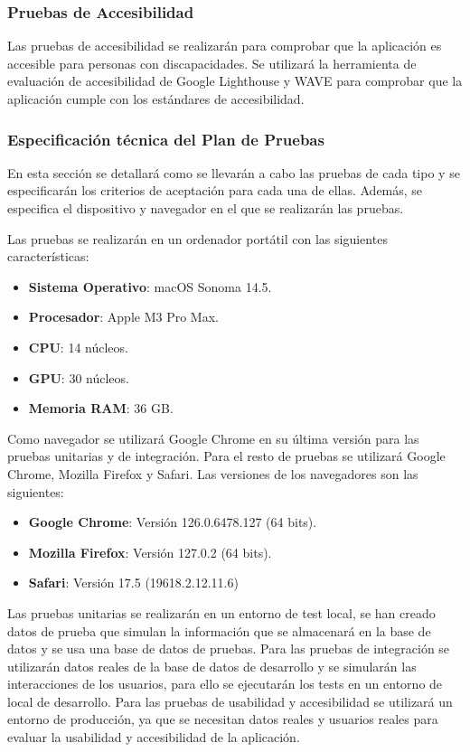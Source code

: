\subsubsection{Pruebas de Accesibilidad}
Las pruebas de accesibilidad se realizarán para comprobar que la aplicación es accesible para personas con discapacidades.
Se utilizará la herramienta de evaluación de accesibilidad de Google Lighthouse y WAVE para comprobar que la aplicación cumple con los estándares de accesibilidad.


\subsubsection{Especificación técnica del Plan de Pruebas}
En esta sección se detallará como se llevarán a cabo las pruebas de cada tipo y se especificarán los criterios de aceptación para cada una de ellas.
Además, se especifica el dispositivo y navegador en el que se realizarán las pruebas.

Las pruebas se realizarán en un ordenador portátil con las siguientes características:
\begin{itemize}
    \item \textbf{Sistema Operativo}: macOS Sonoma 14.5.
    \item \textbf{Procesador}: Apple M3 Pro Max.
    \item \textbf{CPU}: 14 núcleos.
    \item \textbf{GPU}: 30 núcleos.
    \item \textbf{Memoria RAM}: 36 GB.
\end{itemize}

Como navegador se utilizará Google Chrome en su última versión para las pruebas unitarias y de integración.
Para el resto de pruebas se utilizará Google Chrome, Mozilla Firefox y Safari.
Las versiones de los navegadores son las siguientes:
\begin{itemize}
    \item \textbf{Google Chrome}: Versión 126.0.6478.127 (64 bits).
    \item \textbf{Mozilla Firefox}: Versión 127.0.2 (64 bits).
    \item \textbf{Safari}: Versión 17.5 (19618.2.12.11.6)
\end{itemize}

Las pruebas unitarias se realizarán en un entorno de test local, se han creado datos de prueba que simulan la información que se almacenará en la base de datos y se usa una base de datos de pruebas.
Para las pruebas de integración se utilizarán datos reales de la base de datos de desarrollo y se simularán las interacciones de los usuarios, para ello se ejecutarán los tests en un entorno de local de desarrollo.
Para las pruebas de usabilidad y accesibilidad se utilizará un entorno de producción, ya que se necesitan datos reales y usuarios reales para evaluar la usabilidad y accesibilidad de la aplicación.


